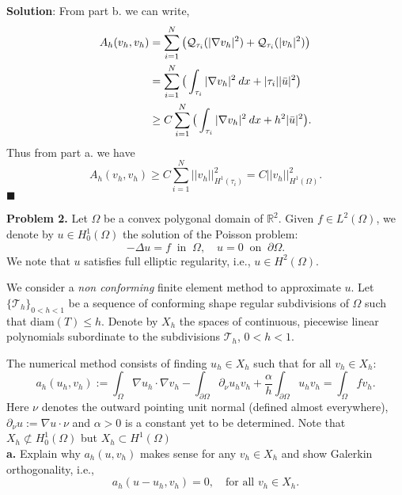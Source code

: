 \documentclass[11pt]{article}
\begin{document}
\vskip 1cm

\textbf{Solution}: From part b. we can write,
\begin{align*}
    A_h(v_h, v_h) &= \sum_{i=1}^N \big( \mathcal{Q}_{\tau_i}(|\nabla v_h|^2) + \mathcal{Q}_{\tau_i}(|v_h|^2) \big) \\
    &= \sum_{i=1}^N \big( \int_{\tau_i} |\nabla v_h|^2 \: dx + |\tau_i| |\Bar{u}|^2 \big) \\
    &\geq C\sum_{i=1}^N \big( \int_{\tau_i} |\nabla v_h|^2 \: dx + h^2 |\Bar{u}|^2 \big).
\end{align*}
Thus from part a. we have 
\begin{equation*}
    A_h(v_h, v_h) \geq C \sum_{i=1}^N ||v_h||^2_{H^1(\tau_i)} = C||v_h||^2_{H^1(\Omega)}.
\end{equation*}
$\blacksquare$


\vskip 2cm



\textbf{Problem 2.} Let $\Omega$ be a convex polygonal domain of $\mathbb{R}^2$. 
Given $f\in L^2(\Omega)$, we denote by $u \in H^1_0(\Omega)$ the solution of the Poisson problem: 
\begin{equation}
    -\Delta u = f \: \text{ in } \: \Omega, \quad u = 0 \: \text{ on } \: \partial\Omega.
\end{equation}
We note that $u$ satisfies full elliptic regularity, i.e., $u\in H^2(\Omega)$.

We consider a {\it non conforming} finite element method to approximate $u$. Let $\{ \mathcal{T}_h \}_{0 < h < 1}$ be a sequence of conforming shape regular subdivisions of $\Omega$ such that $\text{diam}(T) \leq h$. Denote by $X_h$ the spaces of continuous, piecewise linear polynomials subordinate to the subdivisions $\mathcal{T}_h$, $0 < h < 1$.

The numerical method consists of finding $u_h \in X_h$ such that for all $v_h \in X_h$: 
\[ a_h(u_h, v_h) := \int_\Omega \nabla u_h \cdot \nabla v_h - \int_{\partial\Omega} \partial_\nu u_h v_h + \frac{\alpha}{h}\int_{\partial\Omega} u_hv_h = \int_{\Omega} fv_h. \]
Here $\nu$ denotes the outward pointing unit normal (defined almost everywhere), $\partial_\nu u := \nabla u \cdot \nu$ and $\alpha > 0$ is a constant yet to be determined. Note that $X_h \not\subset H^1_0(\Omega)$ but $X_h \subset H^1(\Omega)$
\\[4pt]


{\bf a.} Explain why $a_h(u,v_h)$ makes sense for any $v_h \in X_h$ and show Galerkin orthogonality, i.e.,
\begin{equation}
    a_h(u - u_h, v_h) = 0, \quad \text{for all } v_h \in X_h.
\end{equation}
\end{document}
